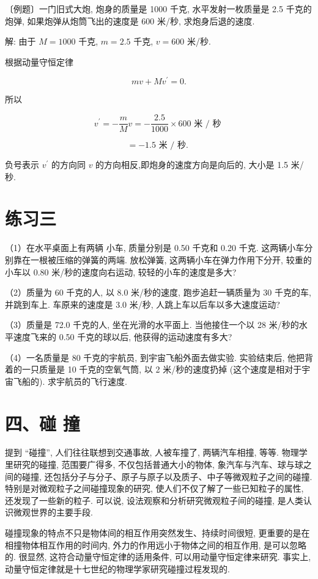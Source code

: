 \documentclass[10pt]{article}
\begin{document}
〔例题〕一门旧式大炮, 炮身的质量是 1000 千克, 水平发射一枚质量是 2.5 千克的炮弹, 如果炮弹从炮筒飞出的速度是 600 米/秒, 求炮身后退的速度.

解: 由于 \(M = {1000}\) 千克, \(m = {2.5}\) 千克, \(v = {600}\) 米/秒.

根据动量守恒定律

\[
{mv} + M{v}^{\prime } = 0.
\]

所以

\[
{v}^{\prime } = - \frac{m}{M}v = - \frac{2.5}{1000} \times {600}\text{ 米 }/\text{ 秒 }
\]

\[
= - {1.5}\text{ 米 }/\text{ 秒. }
\]

负号表示 \({v}^{\prime }\) 的方向同 \(v\) 的方向相反,即炮身的速度方向是向后的, 大小是 1.5 米/秒.

\section*{练习三}

（1）在水平桌面上有两辆 小车, 质量分别是 0.50 千克和 0.20 千克. 这两辆小车分别靠在一根被压缩的弹簧的两端. 放松弹簧, 这两辆小车在弹力作用下分开, 较重的小车以 0.80 米/秒的速度向右运动, 较轻的小车的速度是多大?

（2）质量为 60 千克的人, 以 8.0 米/秒的速度, 跑步追赶一辆质量为 30 千克的车, 并跳到车上. 车原来的速度是 3.0 米/秒, 人跳上车以后车以多大速度运动?

（3）质量是 72.0 千克的人, 坐在光滑的水平面上. 当他接住一个以 28 米/秒的水平速度飞来的 0.50 千克的球以后, 他获得的运动速度有多大?

（4）一名质量是 80 千克的宇航员, 到宇宙飞船外面去做实验. 实验结束后, 他把背着的一只质量是 10 千克的空氧气筒, 以 2 米/秒的速度扔掉 (这个速度是相对于宇宙飞船的). 求宇航员的飞行速度.

\section*{四、碰 撞}

提到 “碰撞”, 人们往往联想到交通事故, 人被车撞了, 两辆汽车相撞, 等等. 物理学里研究的碰撞, 范围要广得多, 不仅包括普通大小的物体, 象汽车与汽车、球与球之间的碰撞, 还包括分子与分子、原子与原子以及质子、中子等微观粒子之间的碰撞. 特别是对微观粒子之间碰撞现象的研究, 使人们不仅了解了一些已知粒子的属性, 还发现了一些新的粒子. 可以说, 设法观察和分析研究微观粒子间的碰撞, 是人类认识微观世界的主要手段.

碰撞现象的特点不只是物体间的相互作用突然发生、持续时间很短, 更重要的是在相撞物体相互作用的时间内, 外力的作用远小于物体之间的相互作用, 是可以忽略的. 很显然, 这符合动量守恒定律的适用条件, 可以用动量守恒定律来研究. 事实上, 动量守恒定律就是十七世纪的物理学家研究碰撞过程发现的.
\end{document}
